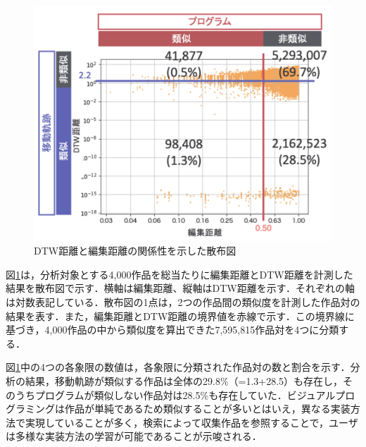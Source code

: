 \documentclass[T,J]{fose} %
\begin{document}
\begin{figure}[t]
	\centering
	\includegraphics[width=1.0\linewidth]{Okamoto_fig/result.pdf}
	\caption{DTW距離と編集距離の関係性を示した散布図}
	\label{fig:out-nolimit}
\end{figure}


図\ref{fig:out-nolimit}は，分析対象とする4,000作品を総当たりに編集距離とDTW距離を計測した結果を散布図で示す．横軸は編集距離、縦軸はDTW距離を示す．それぞれの軸は対数表記している．散布図の1点は，2つの作品間の類似度を計測した作品対の結果を表す．また，編集距離とDTW距離の境界値を赤線で示す．この境界線に基づき，4,000作品の中から類似度を算出できた7,595,815作品対を4つに分類する．

図\ref{fig:out-nolimit}中の4つの各象限の数値は，各象限に分類された作品対の数と割合を示す．分析の結果，移動軌跡が類似する作品は全体の29.8\%（=1.3+28.5）も存在し，そのうちプログラムが類似しない作品対は28.5\%も存在していた．ビジュアルプログラミングは作品が単純であるため類似することが多いとはいえ，異なる実装方法で実現していることが多く，検索によって収集作品を参照することで，ユーザは多様な実装方法の学習が可能であることが示唆される．
\end{document}
